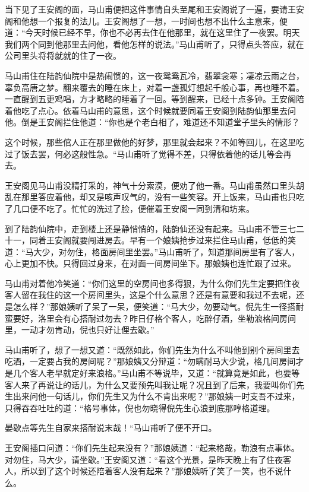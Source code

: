 \documentclass[12pt,UTF8]{ctexbook}
\begin{document}
{{{当下见了王安阁的面，马山甫便把这件事情自头至尾和王安阁说了一遍，要请王安阁和他想一个报复的法儿。王安阁想了一想，一时间也想不出什么主意来，便道：“今天时候已经不早，你也不必再去住在他那里，就在这里住了一夜罢。明天我们两个同到他那里去问他，看他怎样的说法。”马山甫听了，只得点头答应，就在公司里头将将就就的住了一夜。

马山甫住在陆韵仙院中是热闹惯的，这一夜鸳鸯瓦冷，翡翠衾寒；凄凉云雨之台，辜负高唐之梦。翻来覆去的睡在床上，对着一盏孤灯想起千般心事，再也睡不着。一直醒到五更鸡唱，方才略略的睡着了一回。等到醒来，已经十点多钟。王安阁陪着他吃了点心。依着马山甫的意思，这个时候就要同着王安阁到陆韵仙那里去问他。倒是王安阁拦住他道：“你也是个老白相了，难道还不知道堂子里头的情形？

这个时候，那些倌人正在那里做他的好梦，那里就会起来？不如等回儿，在这里吃过了饭去罢，何必这般性急。“马山甫听了觉得不差，只得依着他的话儿等会再去。

王安阁见马山甫没精打采的，神气十分索漠，便劝了他一番。马山甫虽然口里头胡乱在那里答应着他，却又是咳声叹气的，没有一些笑容。开上饭来，马山甫也只吃了几口便不吃了。忙忙的洗过了脸，便催着王安阁一同到清和坊来。

到了陆韵仙院中，走到楼上还是静悄悄的，陆韵仙还没有起来。马山甫不管三七二十一，同着王安阁就要闯进房去。早有一个娘姨抢步过来拦住马山甫，低低的笑道：“马大少，对勿住，格面房间里坐罢。”马山甫听了，知道那间房里有了客人，心上更加不快。只得回过身来，在对面一间房间坐下。那娘姨也连忙跟了过来。

马山甫对着他冷笑道：“你们这里的空房间也多得狠，为什么你们先生定要把住夜客人留在我住的这一个房间里头，这是个什么意思？还是有意要和我过不去呢，还是怎么样？”那娘姨听了呆了一呆，便笑道：“马大少，勿要动气。倪先生一径搭耐蛮要好，洛里会有心搭耐过勿去？昨日仔格个客人，吃醉仔酒，坐勒浪格间房间里，一动才勿肯动，倪也只好让俚去歇。”

马山甫听了，想了一想又道：“既然如此，你们先生为什么不叫他到别个房间里去吃酒，一定要占我的房间呢？”那娘姨又分辩道：“勿瞒耐马大少说，格几间房间才是几个客人老早就定好来浪格。”马山甫不等说毕，又道：“就算竟是如此，也要等客人来了再说让的话儿，为什么又要预先叫我让呢？况且到了后来，我要叫你们先生出来问他一句话儿，你们先生又为什么不肯出来呢？”那娘姨一时支吾不过来，只得吞吞吐吐的道：“格号事体，倪也勿晓得倪先生心浪到底那哼格道理。

晏歇点等先生自家来搭耐说末哉！“马山甫听了便不开口。

王安阁插口问道：“你们先生起来没有？”那娘姨道：“起来格哉，勒浪有点事体。对勿住，马大少，请坐歇。”王安阁又道：“看这个光景，是昨天晚上有了住夜客人，所以到了这个时候还陪着客人没有起来？”那娘姨听了笑了一笑，也不说什么。

}}}
\end{document}
